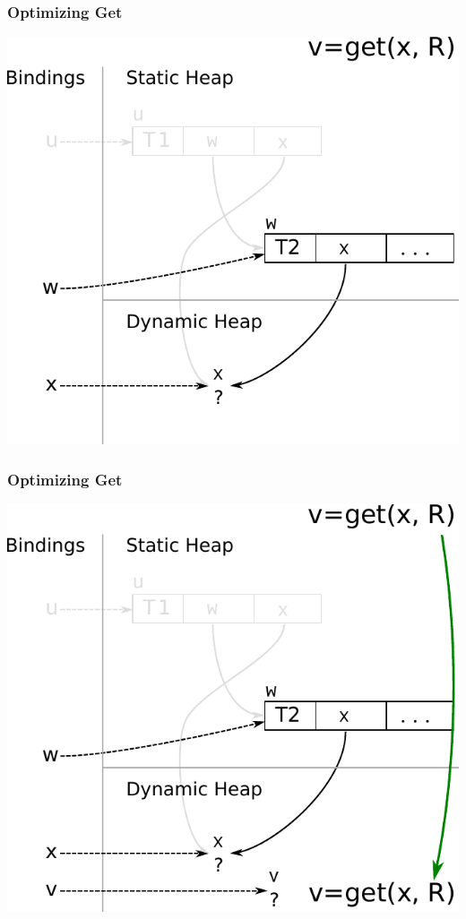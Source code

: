 \documentclass[utf8x]{beamer}
\begin{document}
\begin{frame}[plain]
  \frametitle{Optimizing Get}
  \includegraphics[scale=0.8]{figures/opt_get3}
\end{frame}

\begin{frame}[plain]
  \frametitle{Optimizing Get}
  \includegraphics[scale=0.8]{figures/opt_get4}
\end{frame}
\end{document}
